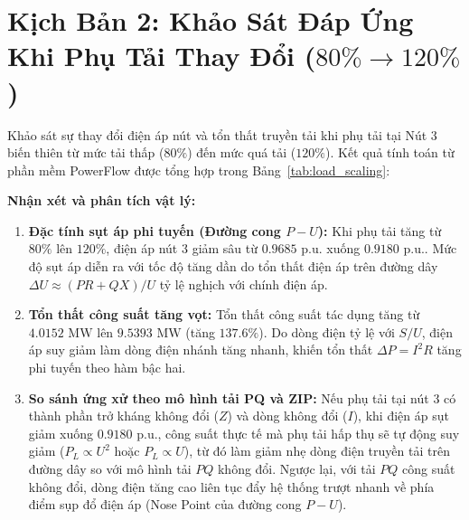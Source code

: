\documentclass[12pt,a4paper,oneside]{report}
\begin{document}
\section{Kịch Bản 2: Khảo Sát Đáp Ứng Khi Phụ Tải Thay Đổi ($80\% \to 120\%$)}
Khảo sát sự thay đổi điện áp nút và tổn thất truyền tải khi phụ tải tại Nút 3 biến thiên từ mức tải thấp ($80\%$) đến mức quá tải ($120\%$). Kết quả tính toán từ phần mềm PowerFlow được tổng hợp trong Bảng~\ref{tab:load_scaling}:

\begin{table}[H]
\centering
\caption{Đáp ứng của lưới điện 3 nút khi phụ tải biến thiên từ 80\% đến 120\%.}
\label{tab:load_scaling}
\end{table}

\noindent \textbf{Nhận xét và phân tích vật lý:}
\begin{enumerate}
    \item \textbf{Đặc tính sụt áp phi tuyến (Đường cong $P-U$):} Khi phụ tải tăng từ $80\%$ lên $120\%$, điện áp nút 3 giảm sâu từ $0.9685\text{ p.u.}$ xuống $0.9180\text{ p.u.}$. Mức độ sụt áp diễn ra với tốc độ tăng dần do tổn thất điện áp trên đường dây $\Delta U \approx (P R + Q X)/U$ tỷ lệ nghịch với chính điện áp.
    \item \textbf{Tổn thất công suất tăng vọt:} Tổn thất công suất tác dụng tăng từ $4.0152\text{ MW}$ lên $9.5393\text{ MW}$ (tăng $137.6\%$). Do dòng điện tỷ lệ với $S/U$, điện áp suy giảm làm dòng điện nhánh tăng nhanh, khiến tổn thất $\Delta P = I^2 R$ tăng phi tuyến theo hàm bậc hai.
    \item \textbf{So sánh ứng xử theo mô hình tải PQ và ZIP:} Nếu phụ tải tại nút 3 có thành phần trở kháng không đổi ($Z$) và dòng không đổi ($I$), khi điện áp sụt giảm xuống $0.9180\text{ p.u.}$, công suất thực tế mà phụ tải hấp thụ sẽ tự động suy giảm ($P_L \propto U^2$ hoặc $P_L \propto U$), từ đó làm giảm nhẹ dòng điện truyền tải trên đường dây so với mô hình tải $PQ$ không đổi. Ngược lại, với tải $PQ$ công suất không đổi, dòng điện tăng cao liên tục đẩy hệ thống trượt nhanh về phía điểm sụp đổ điện áp (Nose Point của đường cong $P-U$).
\end{enumerate}
\end{document}
